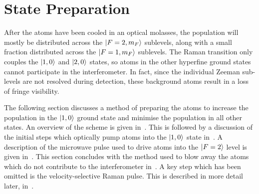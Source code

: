\section{State Preparation}\label{sec:state_prep}
After the atoms have been cooled in an optical molasses, the
population will mostly be distributed across the \(\ket{F=2,m_F}\)
sublevels,
along with a small fraction distributed across the \(\ket{F=1,m_F}\)
sublevels. The Raman transition only couples the \(\ket{1,0}\) and
\(\ket{2,0}\) states, so atoms in the other hyperfine ground states
cannot participate in the interferometer. In fact, since the
individual Zeeman sub-levels are not resolved during detection, these
background atoms result in a loss of fringe visibility.  
\par\noindent
The following section discusses a method of preparing the atoms to
increase the population in the \(\ket{1,0}\) ground state and minimise
the population in all other states. An overview
of the scheme is given in~. This is
followed by a discussion of the initial steps which optically pump
atoms into the \(\ket{1,0}\) state
in~. A description of the microwave
pulse used to drive atoms into the \(\ket{F=2}\) level is given
in~. This section concludes with the
method used to blow away the atoms which do not contribute to the
interferometer in~. A key step which has
been omitted is the velocity-selective Raman pulse. This is described
in more detail later, in~.
